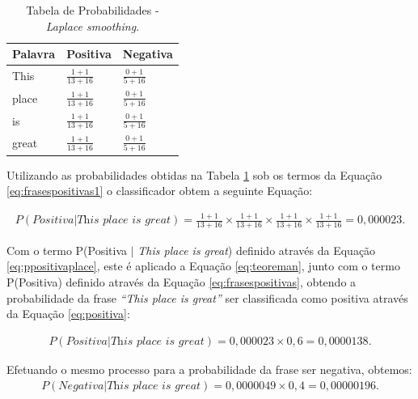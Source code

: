 \begin{table}[htb]
\centering
\renewcommand{\arraystretch}{1.5}%
\begin{tabular}{lll}
\hline

Palavra & Positiva & Negativa \\ \hline
This & \large $\frac{1 + 1}{13 + 16}$ & \large $\frac{0 + 1}{5 + 16}$ \\
place & \large $\frac{1 + 1}{13 + 16}$ & \large $\frac{0 + 1}{5 + 16}$ \\
is & \large $\frac{1 + 1}{13 + 16}$ & \large $\frac{0 + 1}{5 + 16}$ \\
great & \large $\frac{1 + 1}{13 + 16}$ & \large $\frac{0 + 1}{5 + 16}$ \\
\end{tabular}
\caption{Tabela de Probabilidades - \textit{Laplace smoothing}.}
\label{tab:probabilidadesl}
\end{table}

Utilizando as probabilidades obtidas na Tabela
\ref{tab:probabilidadesl} sob os termos da Equação \ref{eq:frasespositivas1} o
classificador obtem a seguinte Equação:

\begin{equation}
\begin{gathered}
P(Positiva|\textit{This place is great}) = \frac{1 + 1}{13 + 16} \times
\frac{1 + 1}{13 + 16} \times \frac{1 + 1}{13 + 16} \times
\frac{1 + 1}{13 + 16} = 0,000023.
\label{eq:ppositivaplace}
\end{gathered}
\end{equation}

Com o termo P(Positiva $\vert$ \textit{This place is great}) definido através da
Equação \ref{eq:ppositivaplace}, este é aplicado a Equação \ref{eq:teoreman},
junto com o termo P(Positiva) definido através da Equação \ref{eq:frasespositivas}, obtendo a probabilidade da frase
\textit{``This place is great''} ser classificada como positiva através da
Equação \ref{eq:positiva}:

\begin{equation}
\begin{gathered}
P(Positiva|\textit{This place is great})
=
0,000023 \times
0,6 = 0,0000138.
\label{eq:positiva}
\end{gathered}
\end{equation}

Efetuando o mesmo processo para a probabilidade da frase ser negativa, obtemos:
\begin{equation}
\begin{gathered}
P(Negativa|\textit{This place is great})
=
0,0000049 \times
0,4 = 0,00000196.
\label{eq:negativa}
\end{gathered}
\end{equation}

